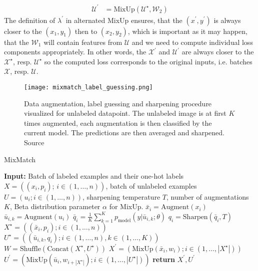 \begin{enumerate}
\begin{align*}
            \mathcal{U}^\prime &= \text{MixUp}(\mathcal{U}^\star,\mathcal{W}_2)
        \end{align*}
        The definition of $\lambda^\prime$ in alternated MixUp ensures, that the $(x^\prime,y^\prime)$ is always closer to the 
        $(x_1,y_1)$ then to $(x_2,y_2)$, which is important as it may happen, that the $\mathcal{W}_1$ will contain features from $\mathcal{U}$
        and we need to compute individual loss components appropriately. In other words, the $\mathcal{X}^\prime$ and $\mathcal{U}^\prime$ are always 
        closer to the $\mathcal{X}^\star$, resp. $\mathcal{U}^\star$ so the computed loss corresponds to the original inputs, i.e. batches $\mathcal{X}$, 
        resp. $\mathcal{U}$.
\end{enumerate}
\begin{figure}[t]
    \centering
    \texttt{[image: mixmatch\_label\_guessing.png]}
    \caption[Mixmatch label guessing]{Data augmentation, label guessing and sharpening procedure visualized for unlabeled datapoint. The unlabeled image is at first $K$ 
    times augmented, each augmentation is then classified by the current model. The predictions are then averaged and sharpened. 
    Source~\cite{mixmatch-2019}}
    \label{fig:mixmatch}
\end{figure}

\begin{algorithm}[H]
 \caption{MixMatch}
 \label{alg:mixmatch}
 \begin{algorithmic}[1]
   \State \textbf{Input:} Batch of labeled examples and their one-hot labels $X = ((x_i, p_i);\,i \in (1, \dots, n))$, batch of unlabeled examples $U = (u_i; i \in (1, \dots, n))$, sharpening temperature $T$, number of augmentations $K$, Beta distribution parameter $\alpha$ for MixUp.
    \State $\bar{x}_i = \text{Augment}(x_i)$ 
     \State $\bar{u}_{i,k} = \text{Augment}(u_i)$ 
    \EndFor
    \State $\bar{q}_i = \frac{1}{K} \sum_{k=1}^{K} p_{\text{model}}(y|\bar{u}_{i,k}; \theta)$ 
    \State $q_i = \text{Sharpen}(\bar{q}_i, T)$ 
   \EndFor
   \State $X^\star = ((\bar{x}_i, p_i); i \in (1, \dots, n))$ 
   \State $U^\star = ((\bar{u}_{i,k}, q_i); i \in (1, \dots, n), k \in (1, \dots, K))$ 
   \State $W = \text{Shuffle}(\text{Concat}(X^\star, U^\star))$ 
   \State $X^\prime = (\text{MixUp}(\bar{x}_i, w_i); i \in (1, \dots, |X^\star|))$ 
   \State $U^\prime = (\text{MixUp}(\bar{u}_{i}, w_{i+|X^\star|}); i \in (1, \dots, |U^\star|))$ 
   \State \textbf{return} $X^\prime, U^\prime$
   
 \end{algorithmic}
\end{algorithm}

